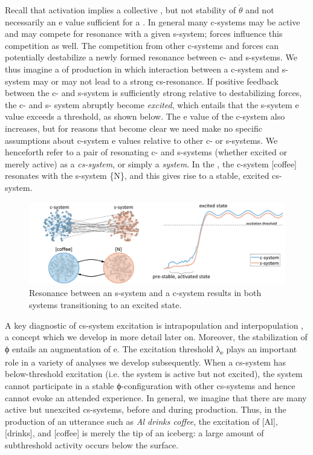  Recall that activation implies a collective , but not stability of $\dot{\theta}$ and not necessarily an e value sufficient for a . In general many c-systems may be active and may compete for resonance with a given s-system;  forces influence this competition as well. The competition from other c-systems and  forces can potentially destabilize a newly formed resonance between c- and s-systems. We thus imagine a  of production in which interaction between a c-system and s-system may or may not lead to a strong cs-resonance. If positive feedback between the c- and s-system is sufficiently strong relative to destabilizing forces, the c- and s- system abruptly become \textit{excited}, which entails that the s-system e value exceeds a threshold, as shown below. The e value of the c-system also increases, but for reasons that become clear we need make no specific assumptions about c-system e values relative to other c- or s-systems. We henceforth refer to a pair of resonating c- and s-systems (whether excited or merely active) as a \textit{cs-system}, or simply a \textit{system}. In the {}, the c-system [coffee] resonates with the s-system \{N\}, and this gives rise to a stable, excited cs-system.

  
\begin{figure}
\includegraphics[width=\textwidth]{figures/Tilsen-img17.png}
\caption{Resonance between an s-system and a c-system results in both systems transitioning to an excited state.}
\label{fig:2:10}
\end{figure}
 
  A key diagnostic of cs-system excitation is intrapopulation and interpopulation , a concept which we develop in more detail later on. Moreover, the stabilization of ϕ entails an augmentation of e. The excitation threshold λ\textsubscript{e} plays an important role in a variety of analyses we develop subsequently. When a cs-system has below-threshold excitation (i.e. the system is active but not excited), the system cannot participate in a stable ϕ-configuration with other cs-systems and hence cannot evoke an attended  experience. In general, we imagine that there are many active but unexcited cs-systems, before and during production. Thus, in the production of an utterance such as \textit{Al drinks coffee}, the excitation of [Al], [drinks], and [coffee] is merely the tip of an iceberg: a large amount of subthreshold activity occurs below the surface.

